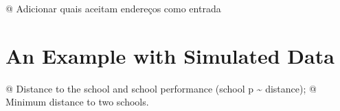 \documentclass[article]{jss}
\begin{document}
@ Adicionar quais aceitam endereços como entrada

\hypertarget{an-example-with-simulated-data}{%
\section{An Example with Simulated
Data}\label{an-example-with-simulated-data}}

@ Distance to the school and school performance (school p
\textasciitilde{} distance); @ Minimum distance to two schools.
\end{document}
